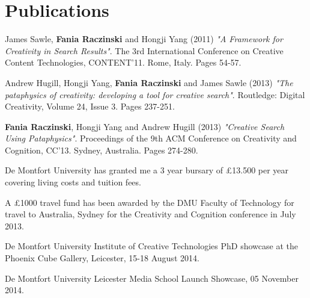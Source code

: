 
\pagestyle{empty}

\chapter{Publications}
\label{pubs}

James Sawle, \textbf{Fania Raczinski} and Hongji Yang (2011) \emph{"A Framework for Creativity in Search Results"}. The 3rd International Conference on Creative Content Technologies, CONTENT'11. Rome, Italy. Pages 54-57.

Andrew Hugill, Hongji Yang, \textbf{Fania Raczinski} and James Sawle (2013) \emph{"The pataphysics of creativity: developing a tool for creative search"}. Routledge: Digital Creativity, Volume 24, Issue 3. Pages 237-251.

\textbf{Fania Raczinski}, Hongji Yang and Andrew Hugill (2013) \emph{"Creative Search Using Pataphysics"}. Proceedings of the 9th ACM Conference on Creativity and Cognition, CC'13. Sydney, Australia. Pages 274-280.

\grule

De Montfort University has granted me a 3 year bursary of £13.500 per year covering living costs and tuition fees.

A £1000 travel fund has been awarded by the DMU Faculty of Technology for travel to Australia, Sydney for the Creativity and Cognition conference in July 2013.

\grule

De Montfort University Institute of Creative Technologies PhD showcase at the Phoenix Cube Gallery, Leicester, 15-18 August 2014.

De Montfort University Leicester Media School Launch Showcase, 05 November 2014.

\clearpage

